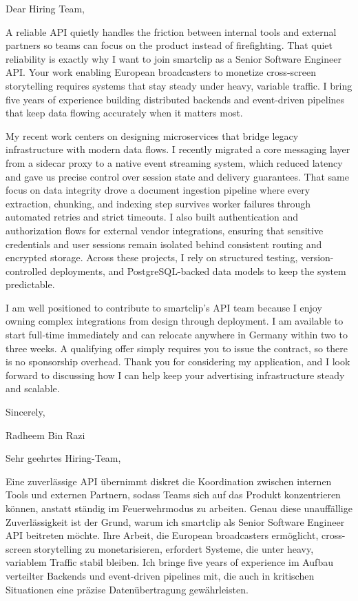 \documentclass[11pt,a4paper]{coverletter}
\begin{document}

\opening{Dear Hiring Team,}

A reliable API quietly handles the friction between internal tools and external partners so teams can focus on the product instead of firefighting. That quiet reliability is exactly why I want to join smartclip as a Senior Software Engineer API. Your work enabling European broadcasters to monetize cross-screen storytelling requires systems that stay steady under heavy, variable traffic. I bring five years of experience building distributed backends and event-driven pipelines that keep data flowing accurately when it matters most.

My recent work centers on designing microservices that bridge legacy infrastructure with modern data flows. I recently migrated a core messaging layer from a sidecar proxy to a native event streaming system, which reduced latency and gave us precise control over session state and delivery guarantees. That same focus on data integrity drove a document ingestion pipeline where every extraction, chunking, and indexing step survives worker failures through automated retries and strict timeouts. I also built authentication and authorization flows for external vendor integrations, ensuring that sensitive credentials and user sessions remain isolated behind consistent routing and encrypted storage. Across these projects, I rely on structured testing, version-controlled deployments, and PostgreSQL-backed data models to keep the system predictable.

I am well positioned to contribute to smartclip’s API team because I enjoy owning complex integrations from design through deployment. I am available to start full-time immediately and can relocate anywhere in Germany within two to three weeks. A qualifying offer simply requires you to issue the contract, so there is no sponsorship overhead. Thank you for considering my application, and I look forward to discussing how I can help keep your advertising infrastructure steady and scalable.

\closing{Sincerely,}{Radheem Bin Razi}

\clearpage
{}


\opening{Sehr geehrtes Hiring-Team,}

Eine zuverlässige API übernimmt diskret die Koordination zwischen internen Tools und externen Partnern, sodass Teams sich auf das Produkt konzentrieren können, anstatt ständig im Feuerwehrmodus zu arbeiten. Genau diese unauffällige Zuverlässigkeit ist der Grund, warum ich smartclip als Senior Software Engineer API beitreten möchte. Ihre Arbeit, die European broadcasters ermöglicht, cross-screen storytelling zu monetarisieren, erfordert Systeme, die unter heavy, variablem Traffic stabil bleiben. Ich bringe five years of experience im Aufbau verteilter Backends und event-driven pipelines mit, die auch in kritischen Situationen eine präzise Datenübertragung gewährleisten.
\end{document}
